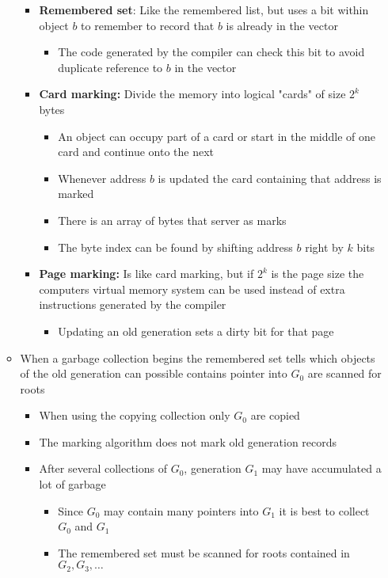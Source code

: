 \documentclass[11pt]{article}
\begin{document}
\begin{itemize}
\begin{itemize}
\begin{itemize}
\begin{itemize}
\end{itemize}
\item \textbf{Remembered set}: Like the remembered list, but uses a bit within object \(b\) to remember to record that \(b\) is already in the vector
\begin{itemize}
\item The code generated by the compiler can check this bit to avoid duplicate reference to \(b\) in the vector
\end{itemize}
\item \textbf{Card marking:} Divide the memory into logical "cards" of size \(2^k\) bytes
\begin{itemize}
\item An object can occupy part of a card or start in the middle of one card and continue onto the next
\item Whenever address \(b\) is updated the card containing that address is marked
\item There is an array of bytes that server as marks
\item The byte index can be found by shifting address \(b\) right by \(k\) bits
\end{itemize}
\item \textbf{Page marking:} Is like card marking, but if \(2^k\) is the page size the computers virtual memory system can be used instead of extra instructions generated by the compiler
\begin{itemize}
\item Updating an old generation sets a dirty bit for that page
\end{itemize}
\end{itemize}
\item When a garbage collection begins the remembered set tells which objects of the old generation can possible contains pointer into \(G_0\) are scanned for roots
\begin{itemize}
\item When using the copying collection only \(G_0\) are copied
\item The marking algorithm does not mark old generation records
\item After several collections of \(G_0\), generation \(G_1\) may have accumulated a lot of garbage
\begin{itemize}
\item Since \(G_0\) may contain many pointers into \(G_1\) it is best to collect \(G_0\) and \(G_1\)
\item The remembered set must be scanned for roots contained in \(G_2, G_3, \dots\)

\end{itemize}
\end{itemize}
\end{itemize}
\end{itemize}
\end{document}
